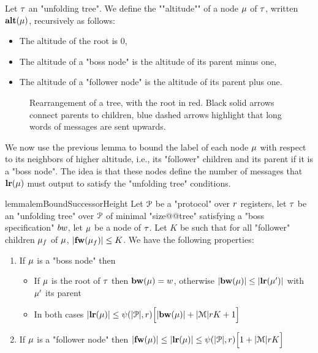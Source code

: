 \begin{definition}
	Let $\tau$ an "unfolding tree". We define the ""altitude"" of a node $\mu$ of $\tau$, written $\mathbf{alt}(\mu)$, recursively as follows:
	\begin{itemize}
		\item The altitude of the root is $0$,
		\item The altitude of a "boss node" is the altitude of its parent minus one,
		\item The altitude of a "follower node" is the altitude of its parent plus one.
	\end{itemize}
\end{definition}

\begin{figure}[h]
	
	\caption{Rearrangement of a tree, with the root in red. Black solid arrows connect parents to children, blue dashed arrows highlight that long words of messages are sent upwards.}
	\label{fig:rearrange-tree}
\end{figure}

We now use the previous lemma to bound the label of each node $\mu$ with respect to its neighbors of higher altitude, i.e., its "follower" children and its parent if it is a "boss node". The idea is that these nodes define the number of messages that $\mathbf{lr}(\mu)$ must output to satisfy the "unfolding tree" conditions.

\begin{restatable}{lemma}{lemBoundSuccessorHeight}
	\label{lem:bound-successor-height}
	Let $\mathcal{P}$ be a "protocol" over $r$ registers, let $\tau$ be an "unfolding tree" over $\mathcal{P}$ of minimal "size@@tree" satisfying a "boss specification" $\bossspec$, let $\mu$ be a node of $\tau$.
	Let $K$ be such that for all "follower" children $\mu_f$ of $\mu$, $|\mathbf{fw}(\mu_f)| \leq K$.
	We have the following properties:
	
	\begin{enumerate}				
		\item  If $\mu$ is a "boss node" then 
		\begin{itemize}
			\item If $\mu$ is the root of $\tau$ then $\mathbf{bw}(\mu) = w$, otherwise $|\mathbf{bw}(\mu)| \leq |\mathbf{lr}(\mu')|$ with $\mu'$ its parent
			
			\item In both cases $|\mathbf{lr}(\mu)| \leq \psi(|\mathcal{P}|,r)\Big[ |\mathbf{bw}(\mu)| + |\mathcal{M}|rK +1 \Big]$
		\end{itemize}
		
		\item If $\mu$ is a "follower node" then  $|\mathbf{fw}(\mu)| \leq |\mathbf{lr}(\mu)| \leq \psi(|\mathcal{P}|,r)\Big[ 1 + |\mathcal{M}|rK \Big]$
			
	\end{enumerate}
\end{restatable}

